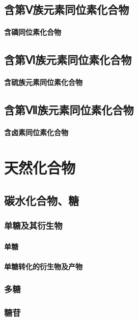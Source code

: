 \documentclass[UTF8]{../03-Chemistry}
\begin{document}
\section{含第Ⅴ族元素同位素化合物}
    \subsubsection{含磷同位素化合物}
\section{含第Ⅵ族元素同位素化合物}
    \subsubsection{含硫族元素同位素化合物}
\section{含第Ⅶ族元素同位素化合物}
    \subsubsection{含卤素同位素化合物}








\chapter{天然化合物}
\section{碳水化合物、糖}
    \subsection{单糖及其衍生物}
        \subsubsection{单糖}
        \subsubsection{单糖转化的衍生物及产物}
    \subsection{多糖}
    \subsection{糖苷}
\end{document}
